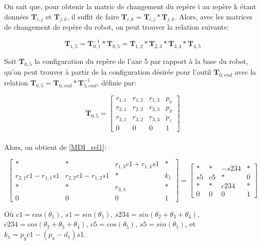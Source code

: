 On sait que, pour obtenir la matric de changement du repère i au repère k étant données $ \bm{T}_{i,j} $ et $ \bm{T}_{j,k} $, il suffit de faire $ \bm{T}_{i,k} = \bm{T}_{i,j} * \bm{T}_{j,k} $. Alors, avec les matrices de changement de repère du robot, on peut trouver la relation suivante:

\begin{equation}
	\bm{T}_{1,5} = \bm{T}_{0,1}^{-1} * \bm{T}_{0,5} = \bm{T}_{1,2} * \bm{T}_{2,3} * \bm{T}_{3,4} * \bm{T}_{4,5}
	\label{MDI_rel1}
\end{equation}
	
Soit $ \bm{T}_{0,5} $ la configuration du repère de l'axe 5 par rapport à la base du robot, qu'on peut trouver à partir de la configuration désirée pour l'outil $ \bm{T}_{0,end} $ avec la relation $ \bm{T}_{0,5} = \bm{T}_{0,end} * \bm{T}_{5,end}^{-1} $, définie par:

\begin{equation}
	\bm{T}_{0,5} = \left[\begin{array}{cccc} r_{1,1} & r_{1,2} & r_{1,3} & p_x \\ r_{2,1} & r_{2,2} & r_{2,3} & p_y \\ r_{3,1} & r_{3,2} & r_{3,3} & p_z \\ 0 & 0 & 0 & 1 \end{array}\right]
\end{equation}
\pagebreak\\
Alors, on obtient de \eqref{MDI_rel1}:

\begin{equation}
	\left[\begin{array}{cccc} * & * & r_{1,3}c1 + r_{1,3}s1 & * \\ r_{2,1}c1 - r_{1,1}s1 & r_{2,2}c1 - r_{1,2}s1 & * & k_1 \\ * & * & r_{3,3} & * \\ 
	0 & 0 & 0 & 1 \end{array}\right] = \left[\begin{array}{cccc} * & * & -s234 & * \\ s5 & c5 & * & 0 \\ * & * & c234 & * \\ 0 & 0 & 0 & 1 \end{array}\right]
\end{equation}

Où $c1 = cos(\theta_1)$, $s1 = sin(\theta_1)$, $s234 = sin(\theta_2 + \theta_3 + \theta_4)$, $c234 = cos(\theta_2 + \theta_3 + \theta_4)$, $c5 = cos(\theta_5)$, $s5 = sin(\theta_5)$, et $k_1 = p_yc1 - (p_x - d_1)s1$.


